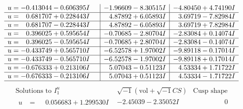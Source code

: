 \documentclass[1p]{elsarticle_modified}
\theoremstyle{definition}
\newcommand{\I}{\sqrt{-1}}
\begin{document}
$$\begin{array}{c|c|c}
\begin{aligned}
u &= -0.413044 - 0.606395 I\end{aligned}
 & -1.96609 - 8.30515 I & -4.80450 + 4.74190 I \\ \hline\begin{aligned}
u &= \phantom{-}0.681707 + 0.228443 I\end{aligned}
 & \phantom{-}4.87892 + 6.05893 I & \phantom{-}3.69719 - 7.82984 I \\ \hline\begin{aligned}
u &= \phantom{-}0.681707 - 0.228443 I\end{aligned}
 & \phantom{-}4.87892 - 6.05893 I & \phantom{-}3.69719 + 7.82984 I \\ \hline\begin{aligned}
u &= \phantom{-}0.396025 + 0.595654 I\end{aligned}
 & -0.70685 - 2.80704 I & -2.83084 + 0.14074 I \\ \hline\begin{aligned}
u &= \phantom{-}0.396025 - 0.595654 I\end{aligned}
 & -0.70685 + 2.80704 I & -2.83084 - 0.14074 I \\ \hline\begin{aligned}
u &= -0.433749 + 0.565710 I\end{aligned}
 & -6.52578 + 1.97002 I & -9.89118 - 0.17014 I \\ \hline\begin{aligned}
u &= -0.433749 - 0.565710 I\end{aligned}
 & -6.52578 - 1.97002 I & -9.89118 + 0.17014 I \\ \hline\begin{aligned}
u &= -0.676333 + 0.213106 I\end{aligned}
 & \phantom{-}5.07043 - 0.51123 I & \phantom{-}4.53334 + 1.71722 I \\ \hline\begin{aligned}
u &= -0.676333 - 0.213106 I\end{aligned}
 & \phantom{-}5.07043 + 0.51123 I & \phantom{-}4.53334 - 1.71722 I\\
 \hline 
 \end{array}$$\newpage$$\begin{array}{c|c|c}  
\text{Solutions to }I^u_{1}& \I (\text{vol} + \sqrt{-1}CS) & \text{Cusp shape}\\
 \hline 
\begin{aligned}
u &= \phantom{-}0.056683 + 1.299530 I\end{aligned}
 & -2.45039 - 2.35052 I & \phantom{-0.000000 } 0 \\ \hline\begin{aligned}

\end{aligned}
\end{array}$$
\end{document}
